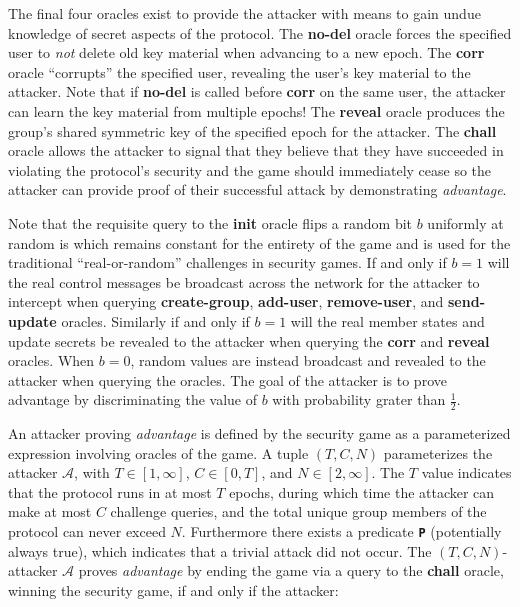 The final four oracles exist to provide the attacker with means to gain undue knowledge of secret aspects of the  protocol.
The \textbf{no-del} oracle forces the specified user to \emph{not} delete old key material when advancing to a new epoch.
The \textbf{corr} oracle ``corrupts'' the specified user, revealing the user's key material to the attacker. Note that if \textbf{no-del} is called before \textbf{corr} on the same user, the attacker can learn the key material from multiple epochs!
The \textbf{reveal} oracle produces the group's shared symmetric key of the specified epoch for the attacker.
The \textbf{chall} oracle allows the attacker to signal that they believe that they have succeeded in violating the  protocol's security and the game should immediately cease so the attacker can provide proof of their successful attack by demonstrating \emph{advantage}.

Note that the requisite query to the \textbf{init} oracle flips a random bit \(b\) uniformly at random is which remains constant for the entirety of the game and is used for the traditional ``real-or-random'' challenges in security games.
If and only if \(b=1\) will the real control messages be broadcast across the network for the attacker to intercept when querying \textbf{create-group}, \textbf{add-user}, \textbf{remove-user}, and \textbf{send-update} oracles.
Similarly if and only if \(b=1\) will the real member states and update secrets be revealed to the attacker when querying the \textbf{corr} and \textbf{reveal} oracles.
When \(b=0\), random values are instead broadcast and revealed to the attacker when querying the oracles.
The goal of the attacker is to prove advantage by discriminating the value of \(b\) with probability grater than \(\frac{1}{2}\).

An attacker proving \emph{advantage} is defined by the  security game as a parameterized expression involving oracles of the game.
A tuple \((T, C, N)\) parameterizes the attacker \(\mathcal{A}\), with \(T \in \left[1, \infty \right]\), \(C \in \left[0, T \right]\), and \(N \in \left[2, \infty \right]\).
The \(T\) value indicates that the protocol runs in at most \(T\) epochs, during which time the attacker can make at most \(C\) challenge queries, and the total unique group members of the protocol can never exceed \(N\).
Furthermore there exists a predicate \textbf{\texttt{P}} (potentially always true), which indicates that a trivial attack did not occur.
The \((T, C, N)\)-attacker \(\mathcal{A}\) proves \emph{advantage} by ending the game via a query to the \textbf{chall} oracle, winning the  security game, if and only if the attacker:

